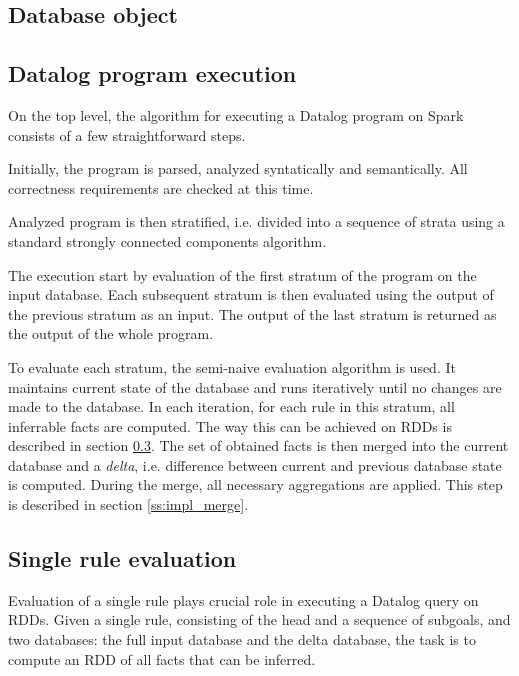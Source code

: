 \subsection{Database object}


\subsection{Datalog program execution}

On the top level, the algorithm for executing a Datalog program on Spark consists of a few straightforward steps.

Initially, the program is parsed, analyzed syntatically and semantically. All correctness requirements are checked at this time.

Analyzed program is then stratified, i.e. divided into a sequence of strata using a standard strongly connected components algorithm.

The execution start by evaluation of the first stratum of the program on the input database. Each subsequent stratum is then evaluated using the output of the previous stratum as an input. The output of the last stratum is returned as the output of the whole program.

To evaluate each stratum, the semi-naive evaluation algorithm is used. It maintains current state of the database and runs iteratively until no changes are made to the database. In each iteration, for each rule in this stratum, all inferrable facts are computed. The way this can be achieved on RDDs is described in section \ref{ss:impl_evalrule}. The set of obtained facts is then merged into the current database and a \emph{delta}, i.e. difference between current and previous database state is computed. During the merge, all necessary aggregations are applied. This step is described in section \ref{ss:impl_merge}.

\subsection{Single rule evaluation}\label{ss:impl_evalrule}
Evaluation of a single rule plays crucial role in executing a Datalog query on RDDs. Given a single rule, consisting of the head and a sequence of subgoals, and two databases: the full input database and the delta database, the task is to compute an RDD of all facts that can be inferred.


